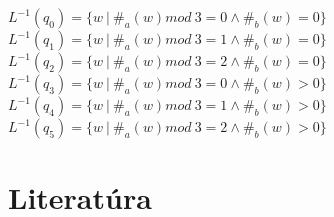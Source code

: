 \documentclass[11pt,a4paper]{article}
\begin{document}
$L^{-1}(q_0) = \{w\ |\ \#_a(w) mod\ 3 = 0 \wedge \#_b(w) = 0\}$\\
$L^{-1}(q_1) = \{w\ |\ \#_a(w) mod\ 3 = 1 \wedge \#_b(w) = 0\}$\\
$L^{-1}(q_2) = \{w\ |\ \#_a(w) mod\ 3 = 2 \wedge \#_b(w) = 0\}$\\
$L^{-1}(q_3) = \{w\ |\ \#_a(w) mod\ 3 = 0 \wedge \#_b(w) > 0\}$\\
$L^{-1}(q_4) = \{w\ |\ \#_a(w) mod\ 3 = 1 \wedge \#_b(w) > 0\}$\\
$L^{-1}(q_5) = \{w\ |\ \#_a(w) mod\ 3 = 2 \wedge \#_b(w) > 0\}$\\


\newpage
\section{Literatúra}

\begin{flushleft}
    
\end{flushleft}
\end{document}
